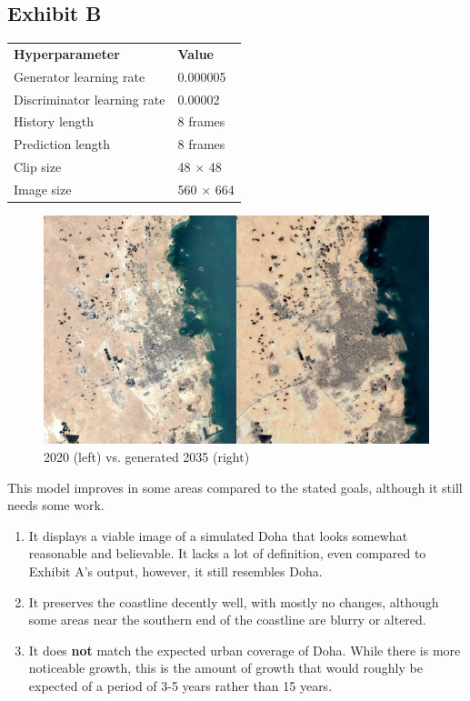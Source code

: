\documentclass{article}
\begin{document}
\clearpage

\subsection{Exhibit B}

\begin{table}[h]
\begin{tabular}{ll}
\textbf{Hyperparameter} & \textbf{Value}\\
Generator learning rate & 0.000005\\
Discriminator learning rate & 0.00002\\
History length & 8 frames\\
Prediction length & 8 frames\\
Clip size & 48 $\times$ 48\\
Image size & 560 $\times$ 664\\
\end{tabular}
\end{table}

\begin{figure}[H]
    \caption{2020 (left) vs. generated 2035 (right)}
    \centering
    \includegraphics[width=0.7\linewidth]{exhibit-b-comp.jpg}
\end{figure}

This model improves in some areas compared to the stated goals, although it still needs some work.

\begin{enumerate}[label=(\alph*)]
    \item It displays a viable image of a simulated Doha that looks somewhat reasonable and believable. It lacks a lot of definition, even compared to Exhibit A's output, however, it still resembles Doha.
    \item It preserves the coastline decently well, with mostly no changes, although some areas near the southern end of the coastline are blurry or altered.
    \item It does \textbf{not} match the expected urban coverage of Doha. While there is more noticeable growth, this is the amount of growth that would roughly be expected of a period of 3-5 years rather than 15 years.
\end{enumerate}
\end{document}
